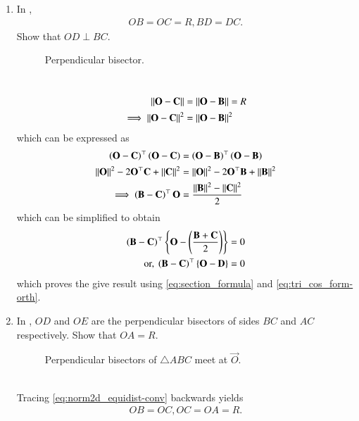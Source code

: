 \begin{enumerate}[label=\thesection.\arabic*.,ref=\thesection.\theenumi]
\item In 
	\label{prob:tri-ccentre-def}
	, 
\begin{align}
OB = OC=R, 	BD = DC.
\end{align}
Show that $OD \perp BC$.
%
\begin{figure}[!ht]
	\begin{center}
		
		\resizebox{\columnwidth}{!}{}
	\end{center}
	\caption{Perpendicular bisector.}
	\label{fig:tri-perp-bis}	
\end{figure}
\\
\solution 
\begin{align}
	\left\lVert\mathbf{O}-\mathbf{C}\right\rVert &=
\left\lVert\mathbf{O}-\mathbf{B}\right\rVert =R
\\
	\implies \left\lVert\mathbf{O}-\mathbf{C}\right\rVert^2 &=
\left\lVert\mathbf{O}-\mathbf{B}\right\rVert^2 
\end{align}
which can be expressed as 
\begin{align}
	\left(\mathbf{O}-\mathbf{C}\right)^{\top} \left(\mathbf{O}-\mathbf{C}\right)&=
	\left(\mathbf{O}-\mathbf{B}\right)^{\top} 
\left(\mathbf{O}-\mathbf{B}\right)
\\
\left\lVert\mathbf{O}\right\rVert^2-2{\mathbf{O}}^{\top}\mathbf{C} + \left\lVert\mathbf{C}\right\rVert^2
	&= \left\lVert\mathbf{O}\right\rVert^2-2{\mathbf{O}}^{\top}\mathbf{B} + \left\lVert\mathbf{B}\right\rVert^2
	\\
	\implies 
	  \left(\mathbf{B}-\mathbf{C}\right)^{\top}{\mathbf{O}} 
	  &=  \frac{\left\lVert\mathbf{B}\right\rVert^2 - \left\lVert\mathbf{C}\right\rVert^2}{2}
\end{align}
which can be simplified to obtain
  \begin{align}
	  \left(\mathbf{B}-\mathbf{C}\right)^{\top}\left\{{\mathbf{O}}- 
	    \left(\frac{{\mathbf{B}} + {\mathbf{C}}}{2}\right)\right\}=0
  \label{eq:norm2d_equidist}
  \\
	  \text{or, }
	  \left(\mathbf{B}-\mathbf{C}\right)^{\top}\left\{{\mathbf{O}}- \mathbf{D}\right\}=0
  \label{eq:norm2d_equidist-conv}
  \end{align}
  which proves the give result using 
	  \eqref{eq:section_formula}
	  and 
\eqref{eq:tri_cos_form-orth}.
\item In 
	,
$OD$ and $OE$ are the perpendicular bisectors of sides $BC$ and $AC$ respectively.  Show that 
$OA = R$.
\begin{figure}[!ht]
	\begin{center}
		
		\resizebox{\columnwidth}{!}{}
	\end{center}
	\caption{ Perpendicular bisectors of $\triangle ABC$ meet at $\vec{O}$.}
	\label{fig:tri_ccentre}	
\end{figure}
\\
\solution Tracing
  \eqref{eq:norm2d_equidist-conv}
  backwards yields
\begin{align}
	OB = OC, OC = OA = R.
\end{align}
\end{enumerate}
